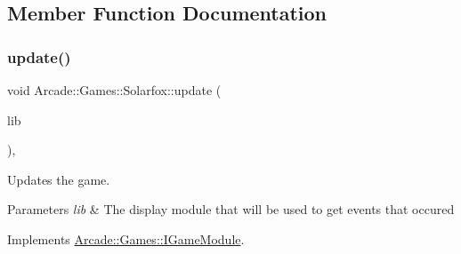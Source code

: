 \subsection{Member Function Documentation}
\mbox{\label{classArcade_1_1Games_1_1Solarfox_a87d7898dc7b5d8c658a18c45d35be991}} 
\subsubsection{\texorpdfstring{update()}{update()}}
{\footnotesize\ttfamily void Arcade\+::\+Games\+::\+Solarfox\+::update (\begin{DoxyParamCaption}\item[{const \mbox{\hyperlink{classArcade_1_1Display_1_1IDisplayModule}{Arcade\+::\+Display\+::\+I\+Display\+Module}} \&}]{lib }\end{DoxyParamCaption})\hspace{0.3cm}{\ttfamily [final]}, {\ttfamily [virtual]}}



Updates the game. 


\begin{DoxyParams}{Parameters}
{\em lib} & The display module that will be used to get events that occured \\
\hline
\end{DoxyParams}


Implements \mbox{\hyperlink{classArcade_1_1Games_1_1IGameModule_a421d1064fcc112dfc7ea025fc7f88aa7}{Arcade\+::\+Games\+::\+I\+Game\+Module}}.

